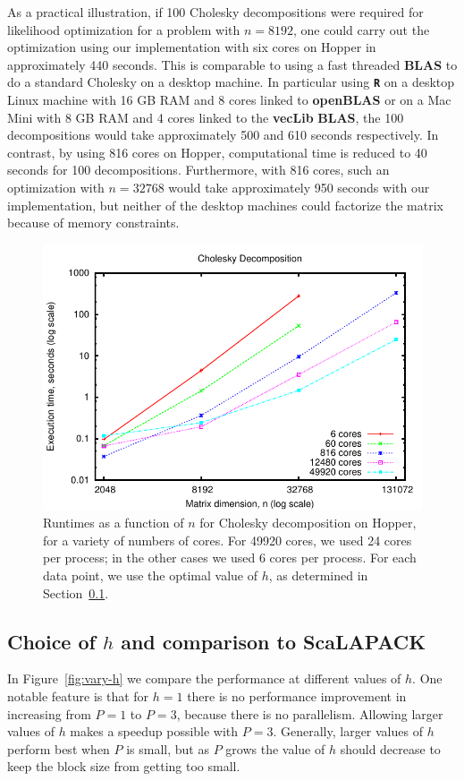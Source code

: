 \documentclass[12pt]{article}
\newcommand{\proglang}[1]{\textbf{\texttt{#1}}}
\newcommand{\pkg}[1]{\textbf{#1}}
\begin{document}
As a practical illustration, if 100 Cholesky decompositions were required for likelihood optimization for a problem with $n=8192$, one could carry out the optimization using our implementation with six cores on Hopper in approximately 440 seconds. This is comparable to using a fast threaded \pkg{BLAS} to do a standard Cholesky on a desktop machine. In particular using \proglang{R} on a desktop Linux machine with 16 GB RAM and 8 cores linked to \pkg{openBLAS} or on a Mac Mini with 8 GB RAM and 4 cores linked to the \pkg{vecLib} \pkg{BLAS}, the 100 decompositions would take approximately 500 and 610 seconds respectively. In contrast, by using 816 cores on Hopper, computational time is reduced to 40 seconds for 100 decompositions. Furthermore, with 816 cores, such an optimization with $n=32768$ would take approximately 950 seconds with our implementation, but neither of the desktop machines could factorize the matrix because of memory constraints. 

\begin{figure}
  \centering
  \includegraphics[scale=1]{figs/plotb}
  \caption{Runtimes as a function of \(n\) for Cholesky decomposition on Hopper, for a variety of numbers of cores.  For 49920 cores, we used 24 cores per process; in the other cases we used 6 cores per process. For each data point, we use the optimal value of \(h\), as determined in Section~\ref{sec:choiceH}. }
  \label{fig:vary-n}
\end{figure}

\subsection[Choice of h and comparison to ScaLAPACK]{Choice of $h$ and comparison to \pkg{ScaLAPACK}} \label{sec:choiceH}
In Figure~\ref{fig:vary-h} we compare the performance at different values of \(h\).  One notable feature is that for \(h=1\) there is no performance improvement in increasing from \(P=1\) to \(P=3\), because there is no parallelism.  Allowing larger values of \(h\) makes a speedup possible with \(P=3\).  Generally, larger values of \(h\) perform best when \(P\) is small, but as \(P\) grows the value of \(h\) should decrease to keep the block size from getting too small.
\end{document}
